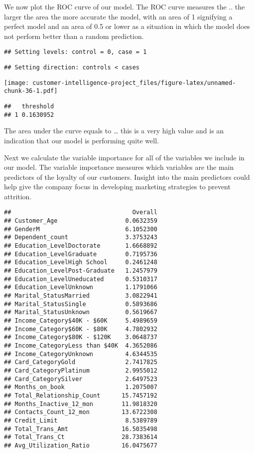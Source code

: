 \documentclass[
]{article}
\begin{document}
We now plot the ROC curve of our model. The ROC curve measures the ..
the larger the area the more accurate the model, with an area of 1
signifying a perfect model and an area of 0.5 or lower as a situation in
which the model does not perform better than a random prediction.

\begin{verbatim}
## Setting levels: control = 0, case = 1
\end{verbatim}

\begin{verbatim}
## Setting direction: controls < cases
\end{verbatim}

\texttt{[image: customer-intelligence-project\_files/figure-latex/unnamed-chunk-36-1.pdf]}

\begin{verbatim}
##   threshold
## 1 0.1630952
\end{verbatim}

The area under the curve equals to \ldots{} this is a very high value
and is an indication that our model is performing quite well.

Next we calculate the variable importance for all of the variables we
include in our model. The variable importance measures which variables
are the main predictors of the loyalty of our customers. Insight into
the main predictors could help give the company focus in developing
marketing strategies to prevent attrition.

\begin{verbatim}
##                                  Overall
## Customer_Age                   0.0632359
## GenderM                        6.1052300
## Dependent_count                3.3753243
## Education_LevelDoctorate       1.6668892
## Education_LevelGraduate        0.7195736
## Education_LevelHigh School     0.2461248
## Education_LevelPost-Graduate   1.2457979
## Education_LevelUneducated      0.5310317
## Education_LevelUnknown         1.1791066
## Marital_StatusMarried          3.0822941
## Marital_StatusSingle           0.5893686
## Marital_StatusUnknown          0.5619667
## Income_Category$40K - $60K     5.4989659
## Income_Category$60K - $80K     4.7802932
## Income_Category$80K - $120K    3.0648737
## Income_CategoryLess than $40K  4.3652086
## Income_CategoryUnknown         4.6344535
## Card_CategoryGold              2.7417825
## Card_CategoryPlatinum          2.9955012
## Card_CategorySilver            2.6497523
## Months_on_book                 1.2075007
## Total_Relationship_Count      15.7457192
## Months_Inactive_12_mon        11.9818320
## Contacts_Count_12_mon         13.6722308
## Credit_Limit                   8.5389789
## Total_Trans_Amt               16.5035498
## Total_Trans_Ct                28.7383614
## Avg_Utilization_Ratio         16.0475677
\end{verbatim}
\end{document}
